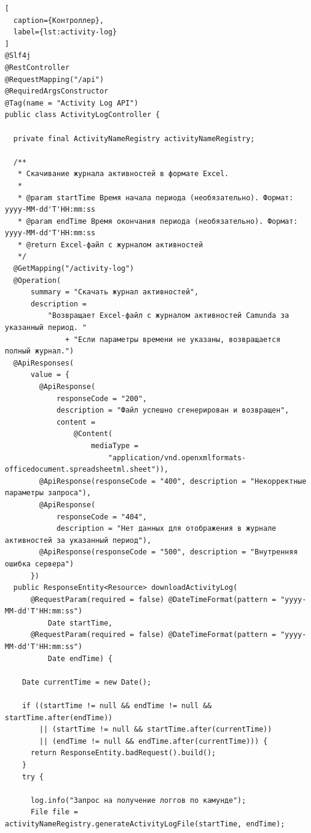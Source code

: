 
\begin{lstlisting}[
  caption={Контроллер},
  label={lst:activity-log}
]
@Slf4j
@RestController
@RequestMapping("/api")
@RequiredArgsConstructor
@Tag(name = "Activity Log API")
public class ActivityLogController {

  private final ActivityNameRegistry activityNameRegistry;

  /**
   * Скачивание журнала активностей в формате Excel.
   *
   * @param startTime Время начала периода (необязательно). Формат: yyyy-MM-dd'T'HH:mm:ss
   * @param endTime Время окончания периода (необязательно). Формат: yyyy-MM-dd'T'HH:mm:ss
   * @return Excel-файл с журналом активностей
   */
  @GetMapping("/activity-log")
  @Operation(
      summary = "Скачать журнал активностей",
      description =
          "Возвращает Excel-файл с журналом активностей Camunda за указанный период. "
              + "Если параметры времени не указаны, возвращается полный журнал.")
  @ApiResponses(
      value = {
        @ApiResponse(
            responseCode = "200",
            description = "Файл успешно сгенерирован и возвращен",
            content =
                @Content(
                    mediaType =
                        "application/vnd.openxmlformats-officedocument.spreadsheetml.sheet")),
        @ApiResponse(responseCode = "400", description = "Некорректные параметры запроса"),
        @ApiResponse(
            responseCode = "404",
            description = "Нет данных для отображения в журнале активностей за указанный период"),
        @ApiResponse(responseCode = "500", description = "Внутренняя ошибка сервера")
      })
  public ResponseEntity<Resource> downloadActivityLog(
      @RequestParam(required = false) @DateTimeFormat(pattern = "yyyy-MM-dd'T'HH:mm:ss")
          Date startTime,
      @RequestParam(required = false) @DateTimeFormat(pattern = "yyyy-MM-dd'T'HH:mm:ss")
          Date endTime) {

    Date currentTime = new Date();

    if ((startTime != null && endTime != null && startTime.after(endTime))
        || (startTime != null && startTime.after(currentTime))
        || (endTime != null && endTime.after(currentTime))) {
      return ResponseEntity.badRequest().build();
    }
    try {

      log.info("Запрос на получение логгов по камунде");
      File file = activityNameRegistry.generateActivityLogFile(startTime, endTime);


\end{lstlisting}
